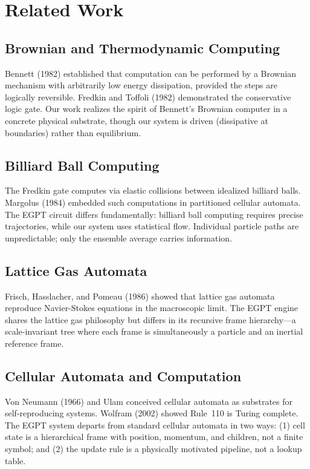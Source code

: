 \documentclass[11pt,a4paper]{article}
\begin{document}
\section{Related Work}
\label{sec:related}

\subsection{Brownian and Thermodynamic Computing}

Bennett (1982) established that computation can be performed by a Brownian mechanism with arbitrarily low energy dissipation, provided the steps are logically reversible. Fredkin and Toffoli (1982) demonstrated the conservative logic gate. Our work realizes the spirit of Bennett's Brownian computer in a concrete physical substrate, though our system is driven (dissipative at boundaries) rather than equilibrium.

\subsection{Billiard Ball Computing}

The Fredkin gate computes via elastic collisions between idealized billiard balls. Margolus (1984) embedded such computations in partitioned cellular automata. The EGPT circuit differs fundamentally: billiard ball computing requires precise trajectories, while our system uses statistical flow. Individual particle paths are unpredictable; only the ensemble average carries information.

\subsection{Lattice Gas Automata}

Frisch, Hasslacher, and Pomeau (1986) showed that lattice gas automata reproduce Navier-Stokes equations in the macroscopic limit. The EGPT engine shares the lattice gas philosophy but differs in its recursive frame hierarchy---a scale-invariant tree where each frame is simultaneously a particle and an inertial reference frame.

\subsection{Cellular Automata and Computation}

Von Neumann (1966) and Ulam conceived cellular automata as substrates for self-reproducing systems. Wolfram (2002) showed Rule~110 is Turing complete. The EGPT system departs from standard cellular automata in two ways: (1) cell state is a hierarchical frame with position, momentum, and children, not a finite symbol; and (2) the update rule is a physically motivated pipeline, not a lookup table.
\end{document}
